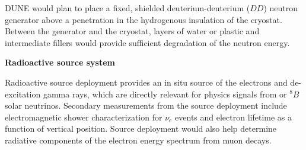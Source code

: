 DUNE would plan to place a fixed, shielded deuterium-deuterium ($DD$) neutron generator  above a penetration in the hydrogenous insulation of the  cryostat. Between the generator and the cryostat, layers of water or plastic and intermediate fillers would provide sufficient degradation of the neutron energy. 


\textbf{Radioactive source system}

Radioactive source deployment provides an in situ source of the electrons and de-excitation gamma rays, which are directly relevant for physics signals from  or $^{8}B$ solar neutrinos. 
Secondary measurements from the source deployment include electromagnetic  shower characterization for  $\nu_e$  events and electron lifetime as a function of  vertical position. Source deployment would also help determine radiative components of the electron energy spectrum from muon decays.

